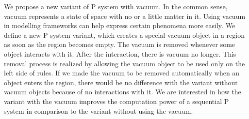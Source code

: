 We propose a new variant of P system with vacuum. In the common sense, vacuum represents a state of space with no or a little matter in it. Using vacuum in modelling frameworks can help express certain phenomena more easily. We define a new P system variant, which creates a special vacuum object in a region as soon as the region becomes empty. The vacuum is removed whenever some object interacts with it. After the interaction, there is vacuum no longer. This removal process is realized by allowing the vacuum object to be used only on the left side of rules. If we made the vacuum to be removed automatically when an object enters the region, there would be no difference with the variant without vacuum objects because of no interactions with it.
We are interested in how the variant with the vacuum improves the computation power of a sequential P system in comparison to the variant without using the vacuum.




